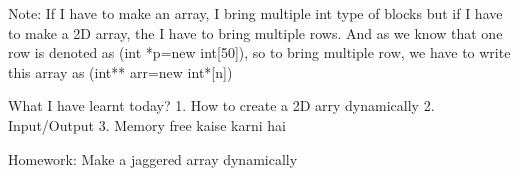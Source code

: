 Note: If I have to make an array, I bring multiple int type of blocks but if I have to make a 2D array, the I have to bring multiple rows.
And as we know that one row is denoted as (int *p=new int[50]), so to bring multiple row, we have to write this array as (int** arr=new int*[n])

What I have learnt today?
1. How to create a 2D arry dynamically
2. Input/Output
3. Memory free kaise karni hai

Homework: Make a jaggered array dynamically
